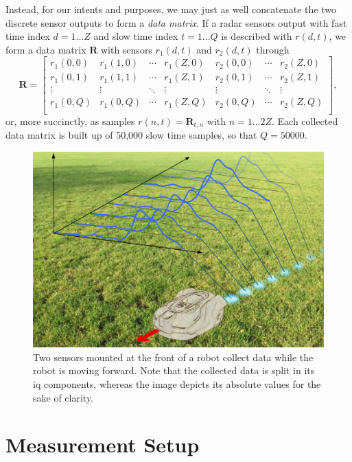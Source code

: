 Instead, for our intents and purposes, we may just as well concatenate the two discrete sensor outputs to form a \emph{data matrix}. If a radar sensors output with fast time index $d=1...Z$ and slow time index $t=1...Q$ is described with $r(d,t)$, we form a data matrix $\mathbf{R}$ with sensors $r_1(d,t)$ and $r_2(d,t)$ through
\begin{equation}
	\mathbf{R}= 
	\begin{bmatrix}
		r_1(0,0) & r_1(1,0) & \cdots & r_1(Z,0) & r_2(0,0) & \cdots & r_2(Z,0) \\
		r_1(0,1) & r_1(1,1) & \cdots & r_1(Z,1) & r_2(0,1) & \cdots & r_2(Z,1) \\
		\vdots &  \vdots & \ddots & \vdots & \vdots & \ddots &  \vdots \\
		r_1(0,Q) & r_1(0,Q) & \cdots  & r_1(Z,Q) & r_2(0,Q) & \cdots  & r_2(Z,Q) \\
	\end{bmatrix}
	,
\end{equation}
or, more succinctly, as samples $r(n,t) = \mathbf{R}_{t,n}$ with $n=1...2Z$. Each collected data matrix is built up of 50,000 slow time samples, so that $Q=50000$.

\begin{figure}
	\centering
	\includegraphics[scale=0.60]{figs_temp/data_collecting.jpg}
	\caption{Two sensors mounted at the front of a robot collect data while the robot is moving forward. Note that the collected data is split in its \gls{iq} components, whereas the image depicts its absolute values for the sake of clarity.}
	\label{fig:data_collecting}
\end{figure}

\section{Measurement Setup}

